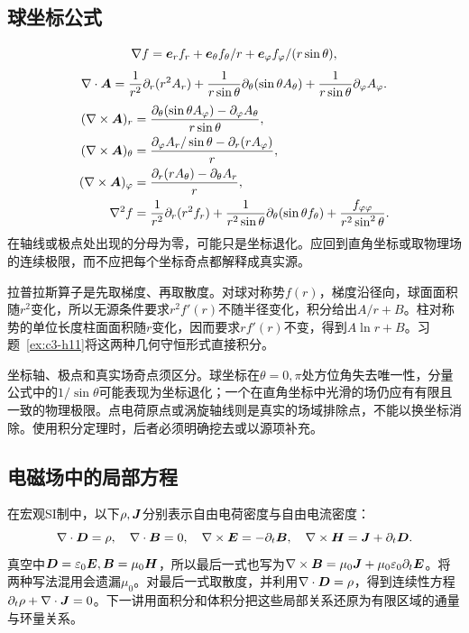 \subsection{球坐标公式}
\[\nabla f=\bm{e}_r f_r+\bm{e}_\theta f_\theta/r+\bm{e}_\varphi f_\varphi/(r\sin\theta),\]
\[\nabla\cdot\bm{A}=\frac1{r^2}\partial_r(r^2A_r)+\frac1{r\sin\theta}\partial_\theta(\sin\theta A_\theta)+\frac1{r\sin\theta}\partial_\varphi A_\varphi.
\]
\begin{align*}
(\nabla\times\bm{A})_r&=\frac{\partial_\theta(\sin\theta A_\varphi)-\partial_\varphi A_\theta}{r\sin\theta},\\
(\nabla\times\bm{A})_\theta&=\frac{\partial_\varphi A_r/\sin\theta-\partial_r(rA_\varphi)}r,\\
(\nabla\times\bm{A})_\varphi&=\frac{\partial_r(rA_\theta)-\partial_\theta A_r}r,\\
\nabla^2f&=\frac1{r^2}\partial_r(r^2f_r)+\frac1{r^2\sin\theta}\partial_\theta(\sin\theta f_\theta)+\frac{f_{\varphi\varphi}}{r^2\sin^2\theta}.
\end{align*}
在轴线或极点处出现的分母为零，可能只是坐标退化。应回到直角坐标或取物理场的连续极限，而不应把每个坐标奇点都解释成真实源。

拉普拉斯算子是先取梯度、再取散度。对球对称势$f(r)$，梯度沿径向，球面面积随$r^2$变化，所以无源条件要求$r^2f'(r)$不随半径变化，积分给出$A/r+B$。柱对称势的单位长度柱面面积随$r$变化，因而要求$rf'(r)$不变，得到$A\ln r+B$。习题~\ref{ex:c3-h11}将这两种几何守恒形式直接积分。

坐标轴、极点和真实场奇点须区分。球坐标在$\theta=0,\pi$处方位角失去唯一性，分量公式中的$1/\sin\theta$可能表现为坐标退化；一个在直角坐标中光滑的场仍应有有限且一致的物理极限。点电荷原点或涡旋轴线则是真实的场域排除点，不能以换坐标消除。使用积分定理时，后者必须明确挖去或以源项补充。

\subsection{电磁场中的局部方程}
在宏观SI制中，以下$\rho,\bm{J}$分别表示自由电荷密度与自由电流密度：
\[\nabla\cdot\bm{D}=\rho,\quad \nabla\cdot\bm{B}=0,\quad
\nabla\times\bm{E}=-\partial_t\bm{B},\quad
\nabla\times\bm{H}=\bm{J}+\partial_t\bm{D}.
\]
真空中$\bm{D}=\varepsilon_0\bm{E},\bm{B}=\mu_0\bm{H}$，所以最后一式也写为$\nabla\times\bm{B}=\mu_0\bm{J}+\mu_0\varepsilon_0\partial_t\bm{E}$。将两种写法混用会遗漏$\mu_0$。对最后一式取散度，并利用$\nabla\cdot\bm{D}=\rho$，得到连续性方程$\partial_t\rho+\nabla\cdot\bm{J}=0$。下一讲用面积分和体积分把这些局部关系还原为有限区域的通量与环量关系。

